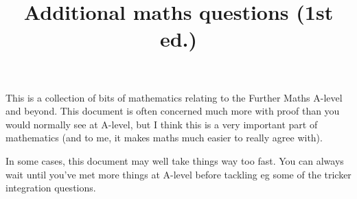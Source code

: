 \documentclass[fleqn,a4paper,11pt]{article}
\date{}
\author{}
\title{Additional maths questions (1st ed.)}
\begin{document}
 \maketitle
 \tableofcontents

 This is a collection of bits of mathematics relating to the Further Maths
 A-level and beyond. This document is often concerned much more with proof than
 you would normally see at A-level, but I think this is a very important part of
 mathematics (and to me, it makes maths much easier to really agree with).

 In some cases, this document may well take things way too fast. You can always
 wait until you've met more things at A-level before tackling eg some of the
 tricker integration questions.

 
 
 
 
 
 
 
\end{document}
